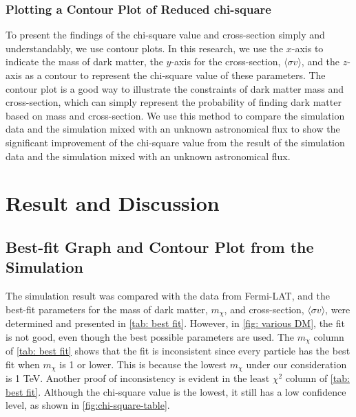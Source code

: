 \documentclass[10pt, oneside]{book}
\numberwithin{equation}{chapter}
\begin{document}
\subsection{Plotting a Contour Plot of Reduced chi-square}
To present the findings of the chi-square value and cross-section simply and understandably, we use contour plots. In this research, we use the $x$-axis to indicate the mass of dark matter, the $y$-axis for the cross-section, $\langle \sigma v \rangle$, and the $z$-axis as a contour to represent the chi-square value of these parameters. The contour plot is a good way to illustrate the constraints of dark matter mass and cross-section, which can simply represent the probability of finding dark matter based on mass and cross-section. We use this method to compare the simulation data and the simulation mixed with an unknown astronomical flux to show the significant improvement of the chi-square value from the result of the simulation data and the simulation mixed with an unknown astronomical flux.


\chapter{Result and Discussion}
\section{Best-fit Graph and Contour Plot from the Simulation}
The simulation result was compared with the data from Fermi-LAT, and the best-fit parameters for the mass of dark matter, $m_\chi$, and cross-section, $\langle \sigma v \rangle$, were determined and presented in \autoref{tab: best fit}. However, in \autoref{fig: various DM}, the fit is not good, even though the best possible parameters are used. The $m_\chi$ column of \autoref{tab: best fit} shows that the fit is inconsistent since every particle has the best fit when $m_\chi$ is 1 or lower. This is because the lowest $m_\chi$ under our consideration is 1 TeV. Another proof of inconsistency is evident in the least $\chi^2$ column of \autoref{tab: best fit}. Although the chi-square value is the lowest, it still has a low confidence level, as shown in \autoref{fig:chi-square-table}.
\end{document}
